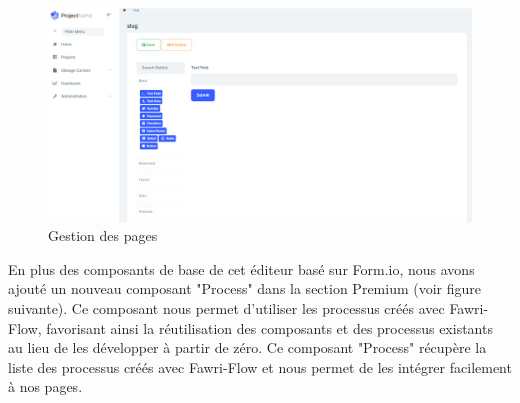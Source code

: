 \begin{enumerate}
          \begin{figure}[H]
              \centering
              \includegraphics[width=17cm]{Figures/manage page.PNG}
              \caption{Gestion des pages}
          \end{figure}


          En plus des composants de base de cet éditeur basé sur Form.io, nous avons ajouté un nouveau composant "Process" dans la section Premium (voir figure suivante). Ce composant nous permet d'utiliser les processus créés avec Fawri-Flow, favorisant ainsi la réutilisation des composants et des processus existants au lieu de les développer à partir de zéro. Ce composant "Process" récupère la liste des processus créés avec Fawri-Flow et nous permet de les intégrer facilement à nos pages.




\end{enumerate}
